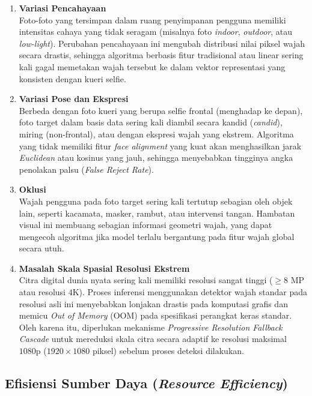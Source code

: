 \begin{enumerate}
  \item \textbf{Variasi Pencahayaan} \\
  Foto-foto yang tersimpan dalam ruang penyimpanan pengguna memiliki intensitas cahaya yang tidak seragam (misalnya foto \textit{indoor}, \textit{outdoor}, atau \textit{low-light}). Perubahan pencahayaan ini mengubah distribusi nilai piksel wajah secara drastis, sehingga algoritma berbasis fitur tradisional atau linear sering kali gagal memetakan wajah tersebut ke dalam vektor representasi yang konsisten dengan kueri selfie.
  
  \item \textbf{Variasi Pose dan Ekspresi} \\
  Berbeda dengan foto kueri yang berupa selfie frontal (menghadap ke depan), foto target dalam basis data sering kali diambil secara kandid (\textit{candid}), miring (non-frontal), atau dengan ekspresi wajah yang ekstrem. Algoritma yang tidak memiliki fitur \textit{face alignment} yang kuat akan menghasilkan jarak \textit{Euclidean} atau kosinus yang jauh, sehingga menyebabkan tingginya angka penolakan palsu (\textit{False Reject Rate}).

  \item \textbf{Oklusi} \\
  Wajah pengguna pada foto target sering kali tertutup sebagian oleh objek lain, seperti kacamata, masker, rambut, atau intervensi tangan. Hambatan visual ini membuang sebagian informasi geometri wajah, yang dapat mengecoh algoritma jika model terlalu bergantung pada fitur wajah global secara utuh.

  \item \textbf{Masalah Skala Spasial Resolusi Ekstrem} \\
  Citra digital dunia nyata sering kali memiliki resolusi sangat tinggi ($\ge 8\text{ MP}$ atau resolusi $4\text{K}$). Proses inferensi menggunakan detektor wajah standar pada resolusi asli ini menyebabkan lonjakan drastis pada komputasi grafis dan memicu \textit{Out of Memory} (OOM) pada spesifikasi perangkat keras standar. Oleh karena itu, diperlukan mekanisme \textit{Progressive Resolution Fallback Cascade} untuk mereduksi skala citra secara adaptif ke resolusi maksimal $1080\text{p}$ ($1920 \times 1080$ piksel) sebelum proses deteksi dilakukan.

\end{enumerate}

\subsection{Efisiensi Sumber Daya (\textit{Resource Efficiency})}

